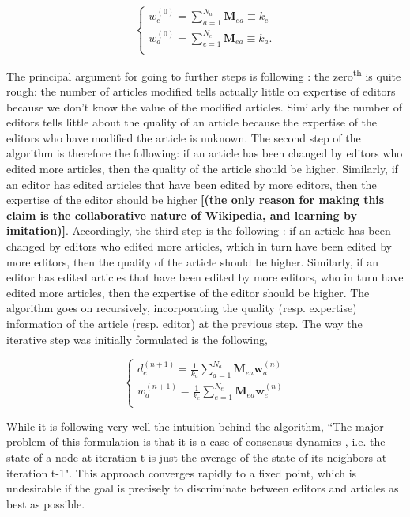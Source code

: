 \begin{equation}
\begin{cases}
 w_{e}^{(0)} = \sum_{a=1}^{N_{a}} \mathbf{M}_{ea} \equiv k_e\\
 w_{a}^{(0)} = \sum_{e=1}^{N_{e}} \mathbf{M}_{ea}  \equiv k_a.\\
\end{cases}
\end{equation}

The principal argument for going to further steps is following : the zero\textsuperscript{th} is quite rough: the number of articles modified tells actually little on expertise of editors because we don't know the value of the modified articles. Similarly the number of editors tells little about the quality of an article because the expertise of the editors who have modified the article is unknown. The second step of the algorithm is therefore the following: if an article has been changed by editors who edited more articles, then the quality of the article should be higher. Similarly, if an editor has edited articles that have been edited by more editors, then the expertise of the editor should be higher {\bf [(the only reason for making this claim is the collaborative nature of Wikipedia, and learning by imitation)]}.  Accordingly, the third step is the following : if an article has been changed by editors who edited more articles, which in turn have been edited by more editors, then the quality of the article should be higher. Similarly, if an editor has edited articles that have been edited by more editors, who in turn have edited more articles, then the expertise of the editor should be higher. The algorithm goes on recursively, incorporating the quality (resp. expertise) information of the article (resp. editor) at the previous step. The way the iterative step was initially formulated is the following, 

\begin{equation}
\begin{cases}
 d_{e}^{(n+1)} = \frac{1}{k_a} \sum_{a=1}^{N_{a}} \mathbf{M}_{ea} \mathbf{w}_{a}^{(n)}\\
 w_{a}^{(n+1)} = \frac{1}{k_e}\sum_{e=1}^{N_{e}} \mathbf{M}_{ea} \mathbf{w}_{e}^{(n)}\\
\end{cases}
\end{equation}

While it is following very well the intuition behind the algorithm, ``The major problem of this formulation is that it is a case of consensus dynamics \cite{shamma2007cooperative}, i.e. the state of a node at iteration t is just the average of the state of its neighbors at iteration t-1". This approach converges rapidly to a fixed point, which is undesirable if the goal is precisely to discriminate between editors and articles as best as possible.

